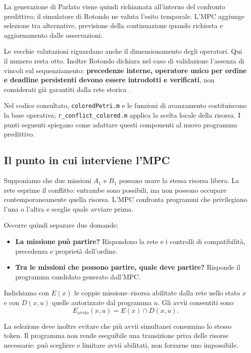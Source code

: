 \documentclass[a4paper,11pt]{article}
\begin{document}
La generazione di Parlato viene quindi richiamata all'interno del confronto predittivo; il simulatore di Rotondo ne valuta l'esito temporale. L'MPC aggiunge selezione tra alternative, previsione della continuazione quando richiesta e aggiornamento dalle osservazioni.

Le vecchie valutazioni riguardano anche il dimensionamento degli operatori. Qui il numero resta otto. Inoltre Rotondo dichiara nel caso di validazione l'assenza di vincoli sul sequenziamento: \textbf{precedenze interne, operatore unico per ordine e deadline persistenti devono essere introdotti e verificati}, non considerati già garantiti dalla rete storica \cite[sezione 3.1, pp. 33--34]{Rotondo}.

Nel codice consultato, \texttt{coloredPetri.m} e le funzioni di avanzamento costituiscono la base operativa; \texttt{r\_conflict\_colored.m} applica la scelta locale della risorsa. I punti seguenti spiegano come adattare questi componenti al nuovo programma predittivo.

\subsection{Il punto in cui interviene l'MPC}

Supponiamo che due missioni $A_1$ e $B_1$ possano usare la stessa risorsa libera. La rete esprime il conflitto: entrambe sono possibili, ma non possono occupare contemporaneamente quella risorsa. L'MPC confronta programmi che privilegiano l'una o l'altra e sceglie quale avviare prima.

Occorre quindi separare due domande:
\begin{itemize}
    \item \textbf{La missione può partire?} Rispondono la rete e i controlli di compatibilità, precedenza e proprietà dell'ordine.
    \item \textbf{Tra le missioni che possono partire, quale deve partire?} Risponde il programma candidato generato dall'MPC.
\end{itemize}

Indichiamo con $E(x)$ le coppie missione--risorsa abilitate dalla rete nello stato $x$ e con $D(x,u)$ quelle autorizzate dal programma $u$. Gli avvii consentiti sono
\begin{equation}
    E_{\mathrm{avvio}}(x,u)=E(x)\cap D(x,u).
\end{equation}

La selezione deve inoltre evitare che più avvii simultanei consumino lo stesso token. Il programma non rende eseguibile una transizione priva delle risorse necessarie: può scegliere e limitare avvii abilitati, non forzarne uno impossibile.
\end{document}
